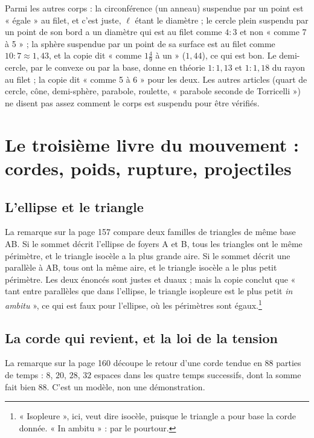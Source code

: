 \documentclass[11pt,a4paper]{article}
\begin{document}
Parmi les autres corps : la circonférence (un anneau) suspendue par un point
est « égale » au filet, et c'est juste, $\ell$ étant le diamètre ; le cercle
plein suspendu par un point de son bord a un diamètre qui est au filet comme
$4 : 3$ et non « comme 7 à 5 » ; la sphère suspendue par un point de sa surface
est au filet comme $10 : 7 \approx 1{,}43$, et la copie dit « comme $1\frac49$ à
un » ($1{,}44$), ce qui est bon. Le demi-cercle, par le convexe ou par la base,
donne en théorie $1 : 1{,}13$ et $1 : 1{,}18$ du rayon au filet ; la copie dit
« comme 5 à 6 » pour les deux. Les autres articles (quart de cercle, cône,
demi-sphère, parabole, roulette, « parabole seconde de Torricelli ») ne
disent pas assez comment le corps est suspendu pour être vérifiés.

\section*{Le troisième livre du mouvement : cordes, poids, rupture, projectiles}

\subsection*{L'ellipse et le triangle}

La remarque sur la page 157 compare deux familles de triangles de même base AB.
Si le sommet décrit l'ellipse de foyers A et B, tous les triangles ont le même
périmètre, et le triangle isocèle a la plus grande aire. Si le sommet décrit
une parallèle à AB, tous ont la même aire, et le triangle isocèle a le plus
petit périmètre. Les deux énoncés sont justes et duaux ; mais la copie conclut
que « tant entre parallèles que dans l'ellipse, le triangle isopleure est le
plus petit \emph{in ambitu} », ce qui est faux pour l'ellipse, où les périmètres
sont égaux.\footnote{« Isopleure », ici, veut dire isocèle, puisque le
triangle a pour base la corde donnée. « In ambitu » : par le pourtour.}

\subsection*{La corde qui revient, et la loi de la tension}

La remarque sur la page 160 découpe le retour d'une corde tendue en 88 parties
de temps : $8$, $20$, $28$, $32$ espaces dans les quatre temps successifs, dont la
somme fait bien 88. C'est un modèle, non une démonstration.
\end{document}
